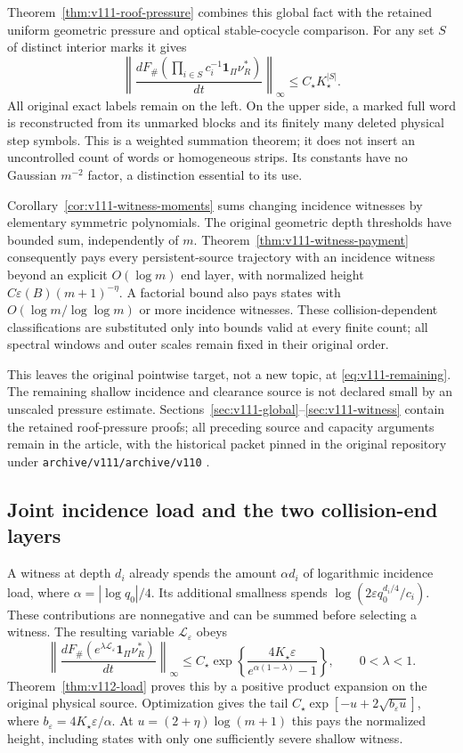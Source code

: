 \documentclass[11pt,reqno]{amsart}
\numberwithin{equation}{section}
\theoremstyle{definition}\newtheorem{definition}[theorem]{Definition}
\theoremstyle{remark}\newtheorem{remark}[theorem]{Remark}
\newcommand{\one}{\mathbf1}\newcommand{\dd}{\,\mathrm d}
\begin{document}
Theorem~\ref{thm:v111-roof-pressure} combines this global fact with
the retained uniform geometric pressure and optical stable-cocycle
comparison. For any set $S$ of distinct interior marks it gives
\[
 \left\|\frac{dF_\#(\prod_{i\in S}c_i^{-1}\one_\Pi\nu_R^*)}{dt}
             \right\|_\infty\le C_\star K_\star^{|S|}.
\]
All original exact labels remain on the left. On the upper side,
a marked full word is reconstructed from its unmarked blocks and
its finitely many deleted physical step symbols. This is a weighted
summation theorem; it does not insert an uncontrolled count of words
or homogeneous strips. Its constants have no Gaussian $m^{-2}$
factor, a distinction essential to its use.

Corollary~\ref{cor:v111-witness-moments} sums changing incidence
witnesses by elementary symmetric polynomials. The original geometric
depth thresholds have bounded sum, independently of $m$.
Theorem~\ref{thm:v111-witness-payment} consequently pays every
persistent-source trajectory with an incidence witness beyond an
explicit $O(\log m)$ end layer, with normalized height
$C\varepsilon(B)(m+1)^{-\eta}$. A factorial bound also pays states
with $O(\log m/\log\log m)$ or more incidence witnesses. These
collision-dependent classifications are substituted only into bounds
valid at every finite count; all spectral windows and outer scales
remain fixed in their original order.

This leaves the original pointwise target, not a new topic, at
\eqref{eq:v111-remaining}. The remaining shallow incidence and
clearance source is not declared small by an unscaled pressure
estimate. Sections~\ref{sec:v111-global}--\ref{sec:v111-witness}
contain the retained roof-pressure proofs; all preceding source and capacity arguments
remain in the article, with the historical packet pinned in the original repository
under \texttt{archive/v111/archive/v110} \cite{Q110}.


\subsection*{Joint incidence load and the two collision-end layers}
A witness at depth $d_i$ already spends the amount
$\alpha d_i$ of logarithmic incidence load, where
$\alpha=|\log q_0|/4$. Its additional smallness spends
$\log(2\varepsilon q_0^{d_i/4}/c_i)$. These contributions are
nonnegative and can be summed before selecting a witness. The
resulting variable $\mathscr L_\varepsilon$ obeys
\[
 \left\|\frac{dF_\#(e^{\lambda\mathscr L_\varepsilon}
                               \one_\Pi\nu_R^*)}{dt}\right\|_\infty
 \le C_\star\exp\left\{\frac{4K_\star\varepsilon}
                                  {e^{\alpha(1-\lambda)}-1}\right\},
 \qquad 0<\lambda<1.
\]
Theorem~\ref{thm:v112-load} proves this by a positive product
expansion on the original physical source. Optimization gives the
tail $C_\star\exp[-u+2\sqrt{b_\varepsilon u}]$, where
$b_\varepsilon=4K_\star\varepsilon/\alpha$.
At $u=(2+\eta)\log(m+1)$ this pays the normalized height, including
states with only one sufficiently severe shallow witness.
\end{document}
